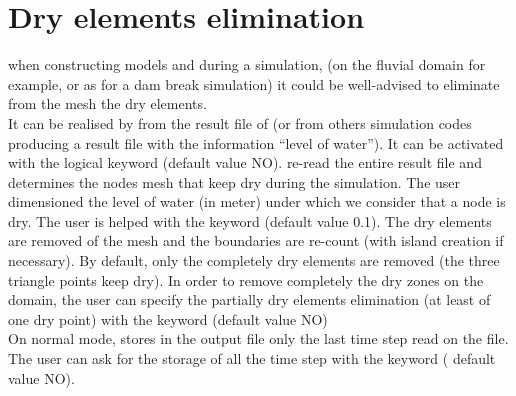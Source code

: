 \chapter{Dry elements elimination}
when constructing models and during a simulation, (on the fluvial domain for
example, or as for a dam break simulation) it could be well-advised to
eliminate from the mesh the dry elements.\\
It can be realised by \stbtel from the result file of  (or from
others simulation codes producing a result file with the information “level of
water”). It can be activated with the logical keyword  (default value NO). \stbtel re-read the entire result file and
determines the nodes mesh that keep dry during the simulation. The user
dimensioned the level of water (in meter) under which we consider that a node
is dry. The user is helped with the keyword  (default value
0.1). The dry elements are removed of the mesh and the boundaries are re-count
(with island creation if necessary).  By default, only the completely dry
elements are removed (the three triangle points keep dry). In order to remove
completely the dry zones on the domain, the user can specify the partially dry
elements elimination (at least of one dry point) with the keyword
 (default value NO)\\
On normal mode, \stbtel stores in the output file only the last time step read
on the  file. The user can ask for the storage of all the time step
with the keyword  ( default value NO).
